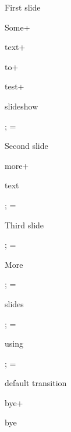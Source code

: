 \sec First slide

Some\pg+

\transition[Dissolve:4]

text\pg+

to\pg+

test\pg+

slideshow

\pg;
\glet\bgcolor=\Green
\transition[Split:3:/Dm /V /M /I]

\sec Second slide

\transitions[Blinds:2]

more\pg+

text

\transitions[Wipe]

\pg;
\glet\bgcolor=\Brown
\transition[Dissolve]

\sec Third slide

\pg;
\glet\bgcolor=\Red
\transition[Box]

\sec More

\pg;
\glet\bgcolor=\Yellow

\sec slides

\pg;
\glet\bgcolor=\Red

\sec using

\pg;
\glet\bgcolor=\Yellow

\sec default transition

bye\pg+

bye

\bye

